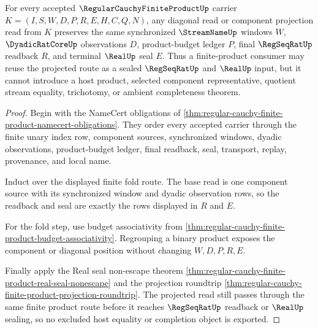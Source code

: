 \begin{theorem}
\label{thm:regular-cauchy-finite-product-diagonal-seal}
For every accepted $\RegularCauchyFiniteProductUp$ carrier $K=(I,S,W,D,P,R,E,H,C,Q,N)$, any diagonal read or component projection read from $K$ preserves the same synchronized $\StreamNameUp$ windows $W$, $\DyadicRatCoreUp$ observations $D$, product-budget ledger $P$, final $\RegSeqRatUp$ readback $R$, and terminal $\RealUp$ seal $E$. Thus a finite-product consumer may reuse the projected route as a sealed $\RegSeqRatUp$ and $\RealUp$ input, but it cannot introduce a host product, selected component representative, quotient stream equality, trichotomy, or ambient completeness theorem.
\end{theorem}
\begin{proof}
Begin with the NameCert obligations of \autoref{thm:regular-cauchy-finite-product-namecert-obligations}. They order every accepted carrier through the finite unary index row, component sources, synchronized windows, dyadic observations, product-budget ledger, final readback, seal, transport, replay, provenance, and local name.

Induct over the displayed finite fold route. The base read is one component source with its synchronized window and dyadic observation rows, so the readback and seal are exactly the rows displayed in $R$ and $E$.

For the fold step, use budget associativity from \autoref{thm:regular-cauchy-finite-product-budget-associativity}. Regrouping a binary product exposes the component or diagonal position without changing $W,D,P,R,E$.

Finally apply the Real seal non-escape theorem \autoref{thm:regular-cauchy-finite-product-real-seal-nonescape} and the projection roundtrip \autoref{thm:regular-cauchy-finite-product-projection-roundtrip}. The projected read still passes through the same finite product route before it reaches $\RegSeqRatUp$ readback or $\RealUp$ sealing, so no excluded host equality or completion object is exported.
\end{proof}

